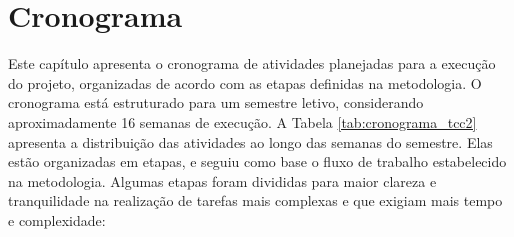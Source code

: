 \chapter[Cronograma]{Cronograma}

Este capítulo apresenta o cronograma de atividades planejadas para a execução do projeto, organizadas de acordo com as etapas definidas na metodologia. O cronograma está estruturado para um semestre letivo, considerando aproximadamente 16 semanas de execução. A Tabela \ref{tab:cronograma_tcc2} apresenta a distribuição das atividades ao longo das semanas do semestre. Elas estão organizadas em etapas, e seguiu como base o fluxo de trabalho estabelecido na metodologia. Algumas etapas foram divididas para maior clareza e tranquilidade na realização de tarefas mais complexas e que exigiam mais tempo e complexidade:

\begin{table}[H]
\centering
\caption{Cronograma de Atividades do TCC 2}
\label{tab:cronograma_tcc2}
\end{table}

